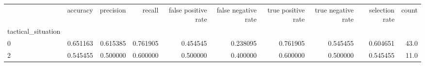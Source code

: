 \begin{tabular}{lrrrrrrrrr}
\toprule
{} &  accuracy &  precision &    recall &  false positive rate &  false negative rate &  true positive rate &  true negative rate &  selection rate &  count \\
tactical\_situation &           &            &           &                      &                      &                     &                     &                 &        \\
\midrule
0                  &  0.651163 &   0.615385 &  0.761905 &             0.454545 &             0.238095 &            0.761905 &            0.545455 &        0.604651 &   43.0 \\
2                  &  0.545455 &   0.500000 &  0.600000 &             0.500000 &             0.400000 &            0.600000 &            0.500000 &        0.545455 &   11.0 \\
\bottomrule
\end{tabular}
